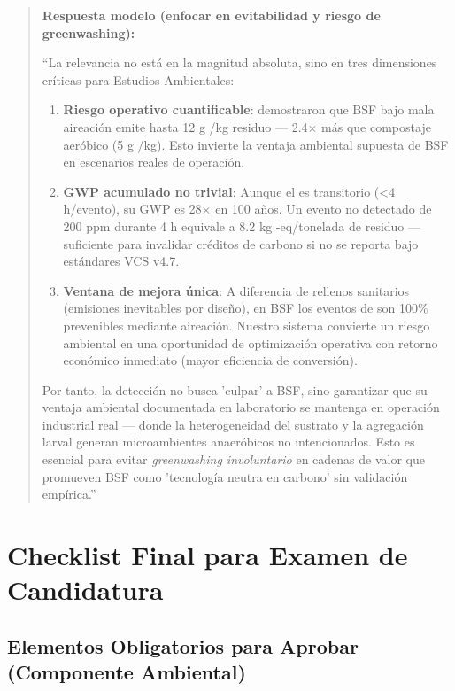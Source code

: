 \documentclass[12pt,oneside]{book}
\begin{document}
\begin{quote}
\textbf{Respuesta modelo (enfocar en evitabilidad y riesgo de greenwashing):}

``La relevancia no está en la magnitud absoluta, sino en tres dimensiones críticas para Estudios Ambientales:

\begin{enumerate}
    \item \textbf{Riesgo operativo cuantificable}: \textcite{mertenat2019greenhouse} demostraron que BSF bajo mala aireación emite hasta 12 g /kg residuo --- 2.4$\times$ más que compostaje aeróbico (5 g /kg). Esto invierte la ventaja ambiental supuesta de BSF en escenarios reales de operación.
    
    \item \textbf{GWP acumulado no trivial}: Aunque el  es transitorio (<4 h/evento), su GWP es 28$\times$  en 100 años. Un evento no detectado de 200 ppm durante 4 h equivale a 8.2 kg -eq/tonelada de residuo --- suficiente para invalidar créditos de carbono si no se reporta bajo estándares VCS v4.7.
    
    \item \textbf{Ventana de mejora única}: A diferencia de rellenos sanitarios (emisiones inevitables por diseño), en BSF los eventos de  son 100\% prevenibles mediante aireación. Nuestro sistema convierte un riesgo ambiental en una oportunidad de optimización operativa con retorno económico inmediato (mayor eficiencia de conversión).
\end{enumerate}

Por tanto, la detección no busca 'culpar' a BSF, sino garantizar que su ventaja ambiental documentada en laboratorio se mantenga en operación industrial real --- donde la heterogeneidad del sustrato y la agregación larval generan microambientes anaeróbicos no intencionados. Esto es esencial para evitar \textit{greenwashing involuntario} en cadenas de valor que promueven BSF como 'tecnología neutra en carbono' sin validación empírica.''
\end{quote}

\chapter{Checklist Final para Examen de Candidatura}

\section{Elementos Obligatorios para Aprobar (Componente Ambiental)}
\end{document}
